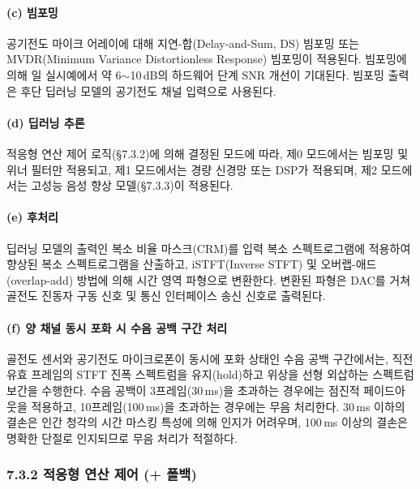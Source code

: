 \documentclass{article}
\begin{document}
\paragraph{(c) 빔포밍}

공기전도 마이크 어레이에 대해 지연-합(Delay-and-Sum, DS) 빔포밍 또는 MVDR(Minimum Variance Distortionless Response) 빔포밍이 적용된다. 빔포밍에 의해 일 실시예에서 약 6$\sim$10\,dB의 하드웨어 단계 SNR 개선이 기대된다. 빔포밍 출력은 후단 딥러닝 모델의 공기전도 채널 입력으로 사용된다.

\paragraph{(d) 딥러닝 추론}

적응형 연산 제어 로직(§7.3.2)에 의해 결정된 모드에 따라, 제0 모드에서는 빔포밍 및 위너 필터만 적용되고, 제1 모드에서는 경량 신경망 또는 DSP가 적용되며, 제2 모드에서는 고성능 음성 향상 모델(§7.3.3)이 적용된다.

\paragraph{(e) 후처리}

딥러닝 모델의 출력인 복소 비율 마스크(CRM)를 입력 복소 스펙트로그램에 적용하여 향상된 복소 스펙트로그램을 산출하고, iSTFT(Inverse STFT) 및 오버랩-애드(overlap-add) 방법에 의해 시간 영역 파형으로 변환한다. 변환된 파형은 DAC를 거쳐 골전도 진동자 구동 신호 및 통신 인터페이스 송신 신호로 출력된다.

\paragraph{(f) 양 채널 동시 포화 시 수음 공백 구간 처리}

골전도 센서와 공기전도 마이크로폰이 동시에 포화 상태인 수음 공백 구간에서는, 직전 유효 프레임의 STFT 진폭 스펙트럼을 유지(hold)하고 위상을 선형 외삽하는 스펙트럼 보간을 수행한다. 수음 공백이 3프레임(30\,ms)을 초과하는 경우에는 점진적 페이드아웃을 적용하고, 10프레임(100\,ms)을 초과하는 경우에는 무음 처리한다. 30\,ms 이하의 결손은 인간 청각의 시간 마스킹 특성에 의해 인지가 어려우며, 100\,ms 이상의 결손은 명확한 단절로 인지되므로 무음 처리가 적절하다.

\subsubsection{7.3.2 적응형 연산 제어 (+ 폴백)}
\end{document}

